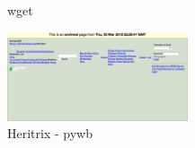 \documentclass{article}
\begin{document}
\begin{center}
\begin{figure}[ht]
    \caption{wget}
    \label{fig:url2_wget}
\end{figure}
\begin{figure}[ht]
    \centering
    \includegraphics[width=0.475\textwidth,natwidth=700,natheight=700]{ex2-heritrix-pywb.png}
    \caption{Heritrix - pywb}
    \label{fig:url2_heritrix_pywb}
\end{figure}
\end{center}

\clearpage
\end{document}
